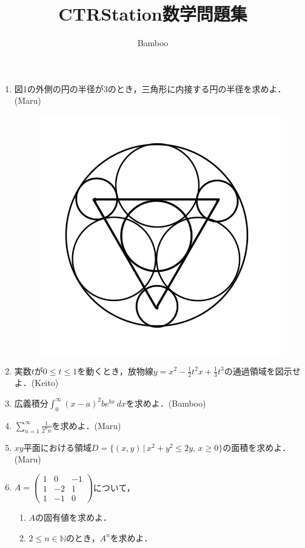 \documentclass{ltjsarticle}
\title{CTRStation数学問題集}
\author{Bamboo}
\begin{document}
\maketitle

\begin{enumerate}
  \setlength{\parskip}{4cm}
  \everymath{\displaystyle}

  \item 図1の外側の円の半径が3のとき，三角形に内接する円の半径を求めよ．(Maru)

  \begin{figure}[htbp]
  \centering
  \includegraphics[scale=0.3]{radius.png}
  \caption{}
  \end{figure}

  \item 実数$t$が$0\le t\le1$を動くとき，放物線$y=x^2-\frac{1}{2}t^2x+\frac{1}{3}t^3$の通過領域を図示せよ．(Keito)
  \item 広義積分$\int_{0}^{∞}(x-a)^2be^{bx}\,dx$を求めよ．(Bamboo)
  \item $\sum_{n=1}^\infty \frac{1}{2^nn}$を求めよ．(Maru)
  \item $xy$平面における領域$D=\{(x,y)\,|\,x^2+y^2\le2y,\,x\ge0\}$の面積を求めよ．(Maru)
  \item $A=\begin{pmatrix}
    1 & 0 & -1 \\
    1 & -2 & 1 \\
    1 & -1 & 0
  \end{pmatrix}$について，
  \setlength{\parskip}{1.8cm}
  \begin{enumerate}
    \setlength{\parskip}{4cm}
    \item $A$の固有値を求めよ．
    \item $2\le n\in \mathbb{N}$のとき，$A^n$を求めよ．
  \end{enumerate}
  \setlength{\parskip}{4cm}

\end{enumerate}
\end{document}
